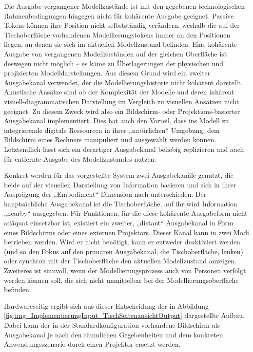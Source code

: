 Die Ausgabe vergangener Modellzustände ist mit den gegebenen technologischen Rahmenbedingungen hingegen nicht für kohärente Ausgabe geeignet. Passive Tokens können ihre Position nicht selbstständig verändern, weshalb die auf der Tischoberfläche vorhandenen Modellierungstokens immer an den Positionen liegen, an denen sie sich im aktuelleń Modellzustand befinden. Eine kohärente Ausgabe von vergangenen Modellzuständen auf der gleichen Oberfläche ist deswegen nicht möglich -- es käme zu Überlagerungen der physischen und projizierten Modelldarstellungen. Aus diesem Grund wird ein zweiter Ausgabekanal verwendet, der die Modellierungshistorie nicht kohärent darstellt. Akustische Ansätze sind ob der Komplexität der Modelle und deren inhärent visuell-diagrammatischen Darstellung im Vergleich zu visuellen Ansätzen nicht geeignet. Zu diesem Zweck wird also ein Bildschirm- oder Projektions-basierter Ausgabekanal implementiert. Dies hat auch den Vorteil, dass ins Modell zu integrierende digitale Ressourcen in ihrer „natürlichen“ Umgebung, dem Bildschirm eines Rechners manipuliert und ausgewählt werden können. Letztendlich lässt sich ein derartiger Ausgabekanal beliebig replizieren und auch für entfernte Ausgabe des Modellzustandes nutzen.

Konkret werden für das vorgestellte System zwei Ausgabekanäle genutzt, die beide auf der visuellen Darstellung von Information basieren und sich in ihrer Ausprägung der „Embodiment“-Dimension nach \citet{Fishkin04} unterschieden. Der hauptsächliche Ausgabekanal ist die Tischoberfläche, auf ihr wird Information „nearby“ ausgegeben. Für Funktionen, für die diese kohärente Ausgabeform nicht adäquat einsetzbar ist, existiert ein zweiter, „distant“ Ausgabekanal in Form eines Bildschirms oder eines externen Projektors. Dieser Kanal kann in zwei Modi betrieben werden. Wird er nicht benötigt, kann er entweder deaktiviert werden (und so den Fokus auf den primären Ausgabekanal, die Tischoberfläche, lenken) oder synchron mit der Tischoberfläche den aktuellen Modellzustand anzeigen. Zweiteres ist sinnvoll, wenn der Modellierungsprozess auch von Personen verfolgt werden können soll, die sich nicht unmittelbar bei der Modellierungsoberfläche befinden. 

Hardwareseitig ergibt sich aus dieser Entscheidung der in Abbildung \ref{fig:img_ImplementierungInput_TischSeitenansichtOutput} dargestellte Aufbau. Dabei kann der in der Standardkonfiguration vorhandene Bildschirm als Ausgabekanal je nach den räumlichen Gegebenheiten und dem konkreten Anwendungsszenario durch einen Projektor ersetzt werden.

